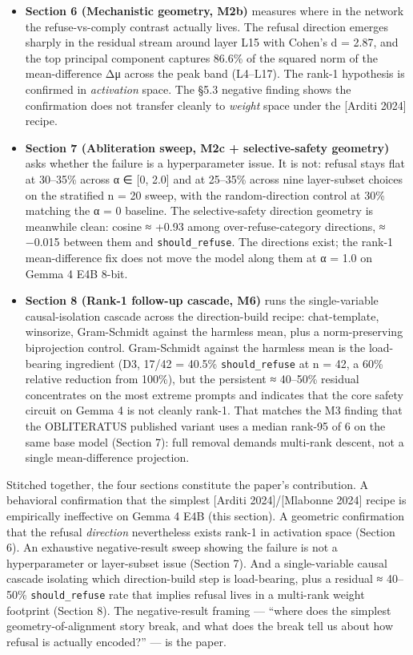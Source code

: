 \documentclass[
  11pt,
]{article}
\providecommand{\tightlist}{%
  \setlength{\itemsep}{0pt}\setlength{\parskip}{0pt}}
\begin{document}
\begin{itemize}
\tightlist
\item
  \textbf{Section 6 (Mechanistic geometry, M2b)} measures where in the
  network the refuse-vs-comply contrast actually lives. The refusal
  direction emerges sharply in the residual stream around layer L15 with
  Cohen's d = 2.87, and the top principal component captures 86.6\% of
  the squared norm of the mean-difference Δμ across the peak band
  (L4--L17). The rank-1 hypothesis is confirmed in \emph{activation}
  space. The §5.3 negative finding shows the confirmation does not
  transfer cleanly to \emph{weight} space under the {[}Arditi 2024{]}
  recipe.
\item
  \textbf{Section 7 (Abliteration sweep, M2c + selective-safety
  geometry)} asks whether the failure is a hyperparameter issue. It is
  not: refusal stays flat at 30--35\% across α ∈ {[}0, 2.0{]} and at
  25--35\% across nine layer-subset choices on the stratified n = 20
  sweep, with the random-direction control at 30\% matching the α = 0
  baseline. The selective-safety direction geometry is meanwhile clean:
  cosine ≈ +0.93 among over-refuse-category directions, ≈ −0.015 between
  them and \texttt{should\_refuse}. The directions exist; the rank-1
  mean-difference fix does not move the model along them at α = 1.0 on
  Gemma 4 E4B 8-bit.
\item
  \textbf{Section 8 (Rank-1 follow-up cascade, M6)} runs the
  single-variable causal-isolation cascade across the direction-build
  recipe: chat-template, winsorize, Gram-Schmidt against the harmless
  mean, plus a norm-preserving biprojection control. Gram-Schmidt
  against the harmless mean is the load-bearing ingredient (D3, 17/42 =
  40.5\% \texttt{should\_refuse} at n = 42, a 60\% relative reduction
  from 100\%), but the persistent ≈ 40--50\% residual concentrates on
  the most extreme prompts and indicates that the core safety circuit on
  Gemma 4 is not cleanly rank-1. That matches the M3 finding that the
  OBLITERATUS published variant uses a median rank-95 of 6 on the same
  base model (Section 7): full removal demands multi-rank descent, not a
  single mean-difference projection.
\end{itemize}

Stitched together, the four sections constitute the paper's
contribution. A behavioral confirmation that the simplest {[}Arditi
2024{]}/{[}Mlabonne 2024{]} recipe is empirically ineffective on Gemma 4
E4B (this section). A geometric confirmation that the refusal
\emph{direction} nevertheless exists rank-1 in activation space (Section
6). An exhaustive negative-result sweep showing the failure is not a
hyperparameter or layer-subset issue (Section 7). And a single-variable
causal cascade isolating which direction-build step is load-bearing,
plus a residual ≈ 40--50\% \texttt{should\_refuse} rate that implies
refusal lives in a multi-rank weight footprint (Section 8). The
negative-result framing --- ``where does the simplest
geometry-of-alignment story break, and what does the break tell us about
how refusal is actually encoded?'' --- is the paper.
\end{document}
